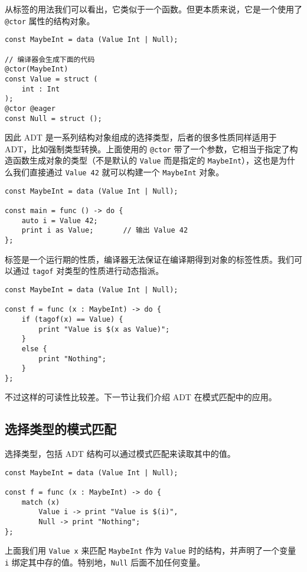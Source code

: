 从标签的用法我们可以看出，它类似于一个函数。但更本质来说，它是一个使用了 \lstinline!@ctor! 属性的结构对象。

\begin{lstlisting}
const MaybeInt = data (Value Int | Null);

// 编译器会生成下面的代码
@ctor(MaybeInt)
const Value = struct (
	int : Int
);
@ctor @eager
const Null = struct ();
\end{lstlisting}

因此 ADT 是一系列结构对象组成的选择类型，后者的很多性质同样适用于 ADT，比如强制类型转换。上面使用的 \lstinline!@ctor! 带了一个参数，它相当于指定了构造函数生成对象的类型（不是默认的 \lstinline!Value! 而是指定的 \lstinline!MaybeInt!），这也是为什么我们直接通过 \lstinline!Value 42! 就可以构建一个 \lstinline!MaybeInt! 对象。

\begin{lstlisting}
const MaybeInt = data (Value Int | Null);

const main = func () -> do {
	auto i = Value 42;
	print i as Value;		// 输出 Value 42
};
\end{lstlisting}

标签是一个运行期的性质，编译器无法保证在编译期得到对象的标签性质。我们可以通过 \lstinline!tagof! 对类型的性质进行动态指派。

\begin{lstlisting}
const MaybeInt = data (Value Int | Null);

const f = func (x : MaybeInt) -> do {
	if (tagof(x) == Value) {
		print "Value is $(x as Value)";
	}
	else {
		print "Nothing";
	}
};
\end{lstlisting}

不过这样的可读性比较差。下一节让我们介绍 ADT 在模式匹配中的应用。

\subsection{选择类型的模式匹配}

选择类型，包括 ADT 结构可以通过模式匹配来读取其中的值。

\begin{lstlisting}
const MaybeInt = data (Value Int | Null);

const f = func (x : MaybeInt) -> do {
	match (x)
		Value i -> print "Value is $(i)",
		Null -> print "Nothing";
};
\end{lstlisting}

上面我们用 \lstinline!Value x! 来匹配 \lstinline!MaybeInt! 作为 \lstinline!Value! 时的结构，并声明了一个变量 \lstinline!i! 绑定其中存的值。特别地，\lstinline!Null! 后面不加任何变量。 \\

